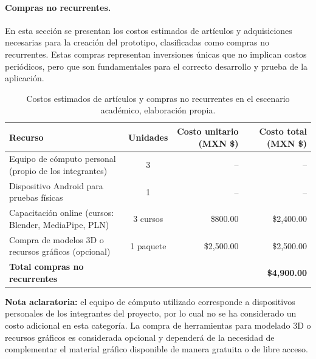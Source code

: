\paragraph{\textbf{Compras no recurrentes.}} 
En esta sección se presentan los costos estimados de artículos y adquisiciones necesarias para la creación del prototipo, clasificadas como compras no recurrentes. Estas compras representan inversiones únicas que no implican costos periódicos, pero que son fundamentales para el correcto desarrollo y prueba de la aplicación.

\begin{table}[H]
	\centering
	\renewcommand{\arraystretch}{1.6}
	\setlength{\tabcolsep}{10pt}
	\Huge
	\begin{adjustbox}{max width=\textwidth}
		\begin{tabular}{|p{7cm}|c|r|r|}
			\hline
			\textbf{Recurso} & \textbf{Unidades} & \textbf{Costo unitario (MXN \$)} & \textbf{Costo total (MXN \$)} \\ \hline
			Equipo de cómputo personal (propio de los integrantes) & 3 & -- & -- \\ \hline
			Dispositivo Android para pruebas físicas & 1 & -- & -- \\ \hline
			Capacitación online (cursos: Blender, MediaPipe, PLN) & 3 cursos & \$800.00 & \$2,400.00 \\ \hline
			Compra de modelos 3D o recursos gráficos (opcional) & 1 paquete & \$2,500.00 & \$2,500.00 \\ \hline
			\textbf{Total compras no recurrentes} & & & \textbf{\$4,900.00} \\ \hline
		\end{tabular}
	\end{adjustbox}
	\caption[Costos estimados de artículos y compras no recurrentes en el escenario académico]{Costos estimados de artículos y compras no recurrentes en el escenario académico, elaboración propia.}
	\label{tab:compras_no_recurrentes}
\end{table}


\noindent \textbf{Nota aclaratoria:}  
el equipo de cómputo utilizado corresponde a dispositivos personales de los integrantes del proyecto, por lo cual no se ha considerado un costo adicional en esta categoría. La compra de herramientas para modelado 3D o recursos gráficos es considerada opcional y dependerá de la necesidad de complementar el material gráfico disponible de manera gratuita o de libre acceso.

